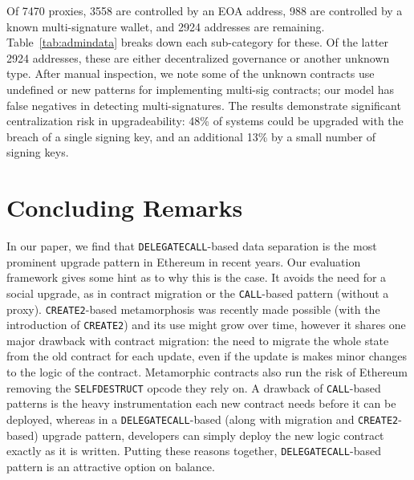Of 7470 proxies, 3558 are controlled by an EOA address, 988 are controlled by a known multi-signature wallet, and 2924 addresses are remaining. Table~\ref{tab:admindata} breaks down each sub-category for these. Of the latter 2924 addresses, these are either decentralized governance or another unknown type. After manual inspection, we note some of the unknown contracts use undefined or new patterns for implementing multi-sig contracts; our model has false negatives in detecting multi-signatures. The results demonstrate significant centralization risk in upgradeability: 48\% of systems could be upgraded with the breach of a single signing key, and an additional 13\% by a small number of signing keys.






\section{Concluding Remarks}


In our paper, we find that \texttt{DELEGATECALL}-based data separation is the most prominent upgrade pattern in Ethereum in recent years. Our evaluation framework gives some hint as to why this is the case. It avoids the need for a social upgrade, as in contract migration or the \texttt{CALL}-based pattern (without a proxy). \texttt{CREATE2}-based metamorphosis was recently made possible (with the introduction of \texttt{CREATE2}) and its use might grow over time, however it shares one major drawback with contract migration: the need to migrate the whole state from the old contract for each update, even if the update is makes minor changes to the logic of the contract. Metamorphic contracts also run the risk of Ethereum removing the \texttt{SELFDESTRUCT} opcode they rely on.  A drawback of \texttt{CALL}-based patterns is the heavy instrumentation each new contract needs before it can be deployed, whereas in a \texttt{DELEGATECALL}-based (along with migration and \texttt{CREATE2}-based) upgrade pattern, developers can simply deploy the new logic contract exactly as it is written. Putting these reasons together, \texttt{DELEGATECALL}-based pattern is an attractive option on balance. 

